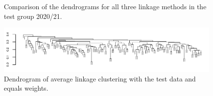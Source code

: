 \documentclass{edm_article}
\begin{document}
\begin{figure}
	\begin{center}
			 \\
			 \\
			\caption{Comparison of the dendrograms for all three linkage methods in the test group 2020/21.}
		\label{fig:dendro}
	\end{center}
\end{figure}

\begin{figure}
	\begin{center}
		\includegraphics[width = \textwidth]{dendro_anon_av_rc.pdf}
		\caption{Dendrogram of average linkage clustering with the test data and equals weights.}
		\label{fig:dendro_rc}
	\end{center}
\end{figure}
\end{document}
